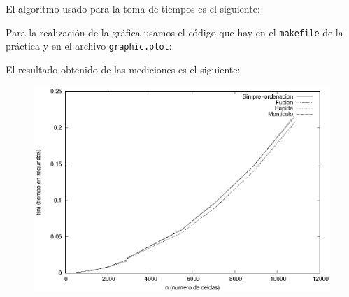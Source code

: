 El algoritmo usado para la toma de tiempos es el siguiente:

Para la realización de la gráfica usamos el código que hay en el \texttt{makefile} de la práctica y en el archivo \texttt{graphic.plot}:

El resultado obtenido de las mediciones es el siguiente:
\begin{figure}[ht]
	\centering
	\includegraphics{graphic.eps}
\end{figure}
